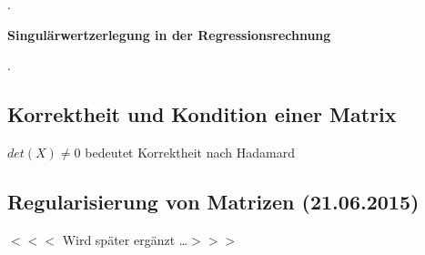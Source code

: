 .\bigskip

\selectfont
\noindent\textbf{Singul\"{a}rwertzerlegung in der Regressionsrechnung} \smallskip

.\bigskip

\subsection{Korrektheit und Kondition einer Matrix}

\noindent $det(X) \neq 0$ bedeutet Korrektheit nach Hadamard

\subsection{Regularisierung von Matrizen (21.06.2015)}

\noindent $<<<$ Wird später ergänzt …$>>>$
